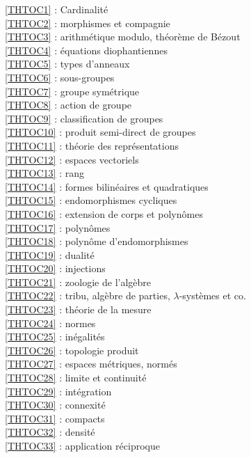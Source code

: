 \ref {THTOC1} : Cardinalité\\
\ref {THTOC2} : morphismes et compagnie\\
\ref {THTOC3} : arithmétique modulo, théorème de Bézout\\
\ref {THTOC4} : équations diophantiennes\\
\ref {THTOC5} : types d'anneaux\\
\ref {THTOC6} : sous-groupes\\
\ref {THTOC7} : groupe symétrique\\
\ref {THTOC8} : action de groupe\\
\ref {THTOC9} : classification de groupes\\
\ref {THTOC10} : produit semi-direct de groupes\\
\ref {THTOC11} : théorie des représentations\\
\ref {THTOC12} : espaces vectoriels\\
\ref {THTOC13} : rang\\
\ref {THTOC14} : formes bilinéaires et quadratiques\\
\ref {THTOC15} : endomorphismes cycliques\\
\ref {THTOC16} : extension de corps et polynômes\\
\ref {THTOC17} : polynômes\\
\ref {THTOC18} : polynôme d'endomorphismes\\
\ref {THTOC19} : dualité\\
\ref {THTOC20} : injections\\
\ref {THTOC21} : zoologie de l'algèbre\\
\ref {THTOC22} : tribu, algèbre de parties, \( \lambda \)-systèmes et co.\\
\ref {THTOC23} : théorie de la mesure\\
\ref {THTOC24} : normes\\
\ref {THTOC25} : inégalités\\
\ref {THTOC26} : topologie produit\\
\ref {THTOC27} : espaces métriques, normés\\
\ref {THTOC28} : limite et continuité\\
\ref {THTOC29} : intégration\\
\ref {THTOC30} : connexité\\
\ref {THTOC31} : compacts\\
\ref {THTOC32} : densité\\
\ref {THTOC33} : application réciproque\\
